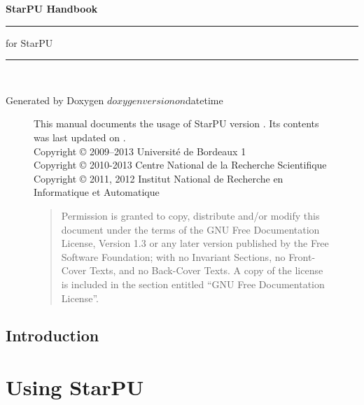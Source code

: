 \documentclass{book}
\begin{document}
\hypersetup{pageanchor=false,citecolor=blue}
\begin{titlepage}
\vspace*{4cm}
{\Huge \textbf{StarPU Handbook}}\\
\rule{\textwidth}{1.5mm}
\begin{flushright}
{\Large for StarPU \STARPUVERSION}
\end{flushright}
\rule{\textwidth}{1mm}
~\\
\vspace*{15cm}
\begin{flushright}
Generated by Doxygen $doxygenversion on $datetime
\end{flushright}
\end{titlepage}

\begin{figure}[p]
This manual documents the usage of StarPU version \STARPUVERSION. Its contents
was last updated on \STARPUUPDATED.\\

Copyright © 2009–2013 Université de Bordeaux 1\\

Copyright © 2010-2013 Centre National de la Recherche Scientifique\\

Copyright © 2011, 2012 Institut National de Recherche en Informatique et Automatique\\

\medskip

\begin{quote}
Permission is granted to copy, distribute and/or modify this document
under the terms of the GNU Free Documentation License, Version 1.3 or
any later version published by the Free Software Foundation; with no
Invariant Sections, no Front-Cover Texts, and no Back-Cover Texts. A
copy of the license is included in the section entitled “GNU Free
Documentation License”.
\end{quote}
\end{figure}

\clearemptydoublepage
{}
\tableofcontents
\clearemptydoublepage
{}
\hypersetup{pageanchor=true,citecolor=blue}

\chapter{Introduction}
\label{index}
\hypertarget{index}{}


\part{Using StarPU}
\end{document}
